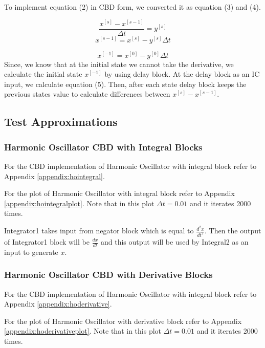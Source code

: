 \documentclass{article}
\begin{document}
To implement equation (2) in CBD form, we converted it as equation (3) and 
(4).\citep{a}

\begin{equation}
{\dfrac{x^{[s]} - x^{[s-1]}}{\Delta t }}= y^{[s]}
\end{equation}
\begin{equation}
x^{[s-1]}= x^{[s]} - y^{[s]}{\Delta t }
\end{equation}

\begin{equation}
x^{[-1]}= x^{[0]} - y^{[0]}{\Delta t }
\end{equation}
Since, we know that at the initial state we cannot take the derivative, we calculate the initial state $x^{[-1]}$ by using delay block. At the delay block as an IC input, we calculate equation (5). Then, after each state delay block keeps the previous states value to calculate differences between ${x^{[s]} - x^{[s-1]}}$.

\subsection{Test Approximations}
\subsubsection{Harmonic Oscillator CBD with Integral Blocks}
For the CBD implementation of Harmonic Oscillator with integral block refer to Appendix \ref{appendix:hointegral}.


For the plot of Harmonic Oscillator with integral block refer to Appendix \ref{appendix:hointegralplot}. Note that in this plot ${\Delta t } = 0.01$ and it iterates 2000 times.

Integrator1 takes input from negator block which is equal to $\frac{d^2 x}{dt^2}$. Then the output of Integrator1 block will be $\frac{dx}{dt}$ and this output will be used by Integral2 as an input to generate $x$.  
\subsubsection{Harmonic Oscillator CBD with Derivative Blocks}
For the CBD implementation of Harmonic Oscillator with integral block refer to Appendix \ref{appendix:hoderivative}.


For the plot of Harmonic Oscillator with derivative block refer to Appendix \ref{appendix:hoderivativeplot}. Note that in this plot ${\Delta t } = 0.01$ and it iterates 2000 times.
\end{document}

